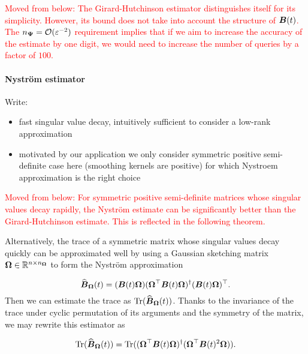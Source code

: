 \color{black}

\textcolor{red}{Moved from below: The Girard-Hutchinson estimator distinguishes itself for its simplicity. However, its bound does not take into account the structure of $\boldsymbol{B}(t)$. The $n_{\boldsymbol{\Psi}} = \mathcal{O}(\varepsilon^{-2})$ requirement implies that if we aim to increase the accuracy of the estimate by one digit, we would need to increase the number of queries by a factor of $100$.   }

\paragraph{Nyström estimator}


Write:
\begin{itemize}
 \item fast singular value decay, intuitively sufficient to consider a low-rank approximation
 \item motivated by our application we only consider symmetric positive semi-definite case here (smoothing kernels are positive) for which Nystroem approximation is the right choice
\end{itemize}


\textcolor{red}{Moved from below:
For symmetric positive semi-definite matrices whose singular values decay rapidly, the Nyström estimate  can be significantly better than the Girard-Hutchinson estimate. This is reflected in the following theorem.}


Alternatively, the trace of a symmetric matrix whose singular values decay quickly can be approximated well by using a Gaussian sketching matrix $\boldsymbol{\Omega} \in \mathbb{R}^{n \times n_{\boldsymbol{\Omega}}}$ to form the Nyström approximation \cite{gittens-2013-revisiting-nystrom}

\begin{equation}
    \widehat{\boldsymbol{B}}_{\boldsymbol{\Omega}}(t) = (\boldsymbol{B}(t) \boldsymbol{\Omega}) (\boldsymbol{\Omega}^{\top} \boldsymbol{B}(t) \boldsymbol{\Omega})^{\dagger} (\boldsymbol{B}(t) \boldsymbol{\Omega})^{\top}.
    \label{equ:nystrom-approximation}
\end{equation}
Then we can estimate the trace as $\operatorname{Tr}(\widehat{\boldsymbol{B}}_{\boldsymbol{\Omega}}(t))$. Thanks to the invariance of the trace under cyclic permutation of its arguments and the symmetry of the matrix, we may rewrite this estimator as

\begin{equation}
    \operatorname{Tr}(\widehat{\boldsymbol{B}}_{\boldsymbol{\Omega}}(t)) = \operatorname{Tr}( (\boldsymbol{\Omega}^{\top} \boldsymbol{B}(t) \boldsymbol{\Omega})^{\dagger} ( \boldsymbol{\Omega}^{\top} \boldsymbol{B}(t)^2 \boldsymbol{\Omega})).
    \label{equ:nystrom-trace-estimator}
\end{equation}

